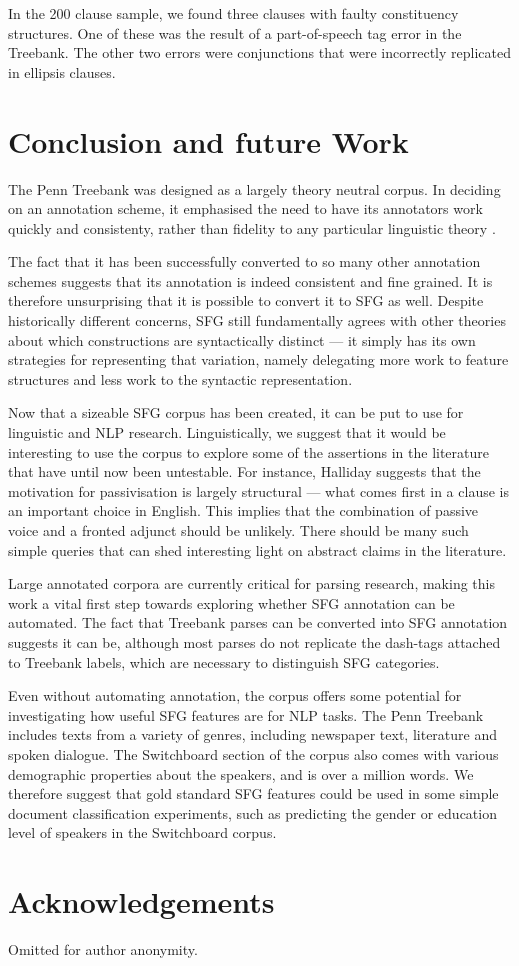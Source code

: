 \documentclass[11pt]{article}
\begin{document}
In the 200 clause sample, we found three clauses with faulty constituency structures. One of these was the result of a part-of-speech tag error in the Treebank. The other two errors were conjunctions that were incorrectly replicated in ellipsis clauses.

\section{Conclusion and future Work}

The Penn Treebank was designed as a largely theory neutral corpus. In deciding on an annotation scheme, it emphasised the need to have its annotators work quickly and consistenty, rather than fidelity to any particular linguistic theory \citep{marcus94building}.

The fact that it has been successfully converted to so many other annotation schemes suggests that its annotation is indeed consistent and fine grained. It is therefore unsurprising that it is possible to convert it to SFG as well. Despite historically different concerns, SFG still fundamentally agrees with other theories about which constructions are syntactically distinct --- it simply has its own strategies for representing that variation, namely delegating more work to feature structures and less work to the syntactic representation.

Now that a sizeable SFG corpus has been created, it can be put to use for linguistic and NLP research. Linguistically, we suggest that it would be interesting to use the corpus to explore some of the assertions in the literature that have until now been untestable. For instance, Halliday suggests that the motivation for passivisation is largely structural --- what comes first in a clause is an important choice in English. This implies that the combination of passive voice and a fronted adjunct should be unlikely. There should be many such simple queries that can shed interesting light on abstract claims in the literature.

Large annotated corpora are currently critical for parsing research, making this work a vital first step towards exploring whether SFG annotation can be automated. The fact that Treebank parses can be converted into SFG annotation suggests it can be, although most parses do not replicate the dash-tags attached to Treebank labels, which are necessary to distinguish SFG categories.

Even without automating annotation, the corpus offers some potential for investigating how useful SFG features are for NLP tasks. The Penn Treebank includes texts from a variety of genres, including newspaper text, literature and spoken dialogue. The Switchboard section of the corpus also comes with various demographic properties about the speakers, and is over a million words. We therefore suggest that gold standard SFG features could be used in some simple document classification experiments, such as predicting the gender or education level of speakers in the Switchboard corpus.

\section{Acknowledgements}

Omitted for author anonymity.



\end{document}

